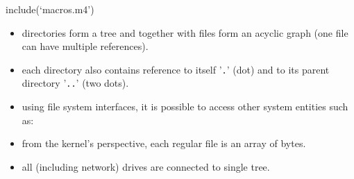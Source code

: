 
include(`macros.m4')



\begin{slide}
\setlength{\baselineskip}{0.8\baselineskip}
\begin{itemize}
\item directories form a tree and together with files form an acyclic graph
(one file can have multiple references).
\item each directory also contains reference to itself '\texttt{.}'
(dot) and to its parent directory '\texttt{..}' (two dots). 
\item using file system interfaces, it is possible to access other system
entities such as:
\item from the kernel's perspective, each regular file is an array of bytes.
\item all (including network) drives are connected to single tree.
\end{itemize}
\end{slide}

\label{DEVFS}

